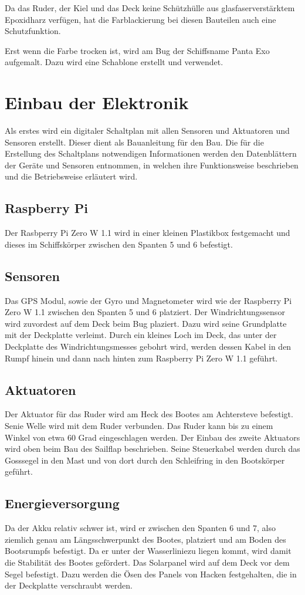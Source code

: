 Da das Ruder, der Kiel und das Deck keine Schützhülle aus glasfaserverstärktem Epoxidharz verfügen, hat die Farblackierung bei diesen Bauteilen auch eine Schutzfunktion.

Erst wenn die Farbe trocken ist, wird am Bug der Schiffsname Panta Exo aufgemalt. Dazu wird eine Schablone erstellt und verwendet. 
\section{Einbau der Elektronik}
Als erstes wird ein digitaler Schaltplan mit allen Sensoren und Aktuatoren und Sensoren erstellt. Dieser dient als Bauanleitung für den Bau. Die für die Erstellung des Schaltplans notwendigen Informationen werden den Datenblättern der Geräte und  Sensoren entnommen, in welchen ihre Funktionsweise beschrieben und die Betriebsweise erläutert wird.
\subsection{Raspberry Pi}
Der Rasbperry Pi Zero W 1.1 wird in einer kleinen Plastikbox festgemacht und dieses im Schiffskörper zwischen den Spanten 5 und 6 befestigt.
\subsection{Sensoren}
Das GPS Modul, sowie der Gyro und Magnetometer wird wie der Raspberry Pi Zero W 1.1 zwischen den Spanten 5 und 6 platziert. Der Windrichtungssensor wird zuvordest auf dem Deck beim Bug plaziert. Dazu wird seine Grundplatte mit der Deckplatte verleimt. Durch ein kleines Loch im Deck, das unter der Deckplatte des Windrichtungsmesses gebohrt wird, werden dessen Kabel in den Rumpf hinein und dann  nach hinten zum Raspberry Pi Zero W 1.1 geführt.
\subsection{Aktuatoren}
Der Aktuator für das Ruder wird am Heck des Bootes am Achtersteve befestigt. Senie Welle wird mit dem Ruder verbunden. Das Ruder kann bis zu einem Winkel von etwa 60 Grad eingeschlagen werden.
Der Einbau des zweite Aktuators wird oben beim Bau des Sailflap beschrieben. Seine Steuerkabel werden durch das Gosssegel in den Mast und von dort durch den Schleifring in den Bootskörper geführt.  
\subsection{Energieversorgung}
Da der Akku relativ schwer ist, wird er zwischen den Spanten 6 und 7, also ziemlich genau am Längsschwerpunkt des Bootes, platziert und am Boden des Bootsrumpfs befestigt. Da er unter der Wasserliniezu liegen kommt, wird damit die Stabilität des Bootes gefördert. Das Solarpanel wird auf dem Deck vor dem Segel befestigt. Dazu werden die Ösen des Panels von Hacken festgehalten, die in der Deckplatte verschraubt werden.

